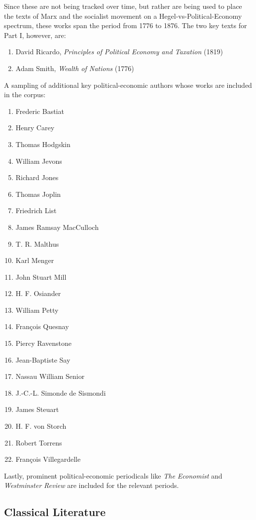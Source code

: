 Since these are not being tracked over time, but rather are being used to place the texts of Marx and the socialist movement on a Hegel-vs-Political-Economy spectrum, these works span the period from 1776 to 1876. The two key texts for Part I, however, are:
\begin{enumerate}
    \item David Ricardo, \textit{Principles of Political Economy and Taxation} (1819)
    \item Adam Smith, \textit{Wealth of Nations} (1776)
\end{enumerate}
A sampling of additional key political-economic authors whose works are included in the corpus:
\begin{enumerate}
    \item Frederic Bastiat
    \item Henry Carey
    \item Thomas Hodgskin
    \item William Jevons
    \item Richard Jones
    \item Thomas Joplin
    \item Friedrich List
    \item James Ramsay MacCulloch
    \item T. R. Malthus
    \item Karl Menger
    \item John Stuart Mill
    \item H. F. Osiander
    \item William Petty
    \item François Quesnay
    \item Piercy Ravenstone
    \item Jean-Baptiste Say
    \item Nassau William Senior
    \item J.-C.-L. Simonde de Sismondi
    \item James Steuart
    \item H. F. von Storch
    \item Robert Torrens
    \item François Villegardelle
\end{enumerate}

Lastly, prominent political-economic periodicals like \textit{The Economist} and \textit{Westminster Review} are included for the relevant periods.

\subsection{Classical Literature}


